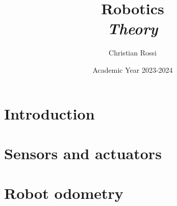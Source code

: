 \documentclass[12pt, a4paper]{report}
\title{Robotics \\ \textit{Theory}}
\author{Christian Rossi}
\date{Academic Year 2023-2024}
\begin{document}
    \maketitle

    

    \cleardoublepage

    \tableofcontents

    \cleardoublepage

    \chapter{Introduction}
    
    
    

    \chapter{Sensors and actuators}
    
    

    \chapter{Robot odometry}
    
        
\end{document}
